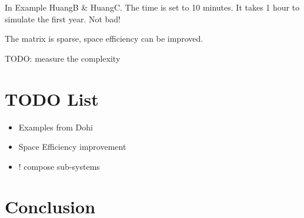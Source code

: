 \documentclass[10pt, journal, compsoc, authoryear]{article}
\numberwithin{equation}{subsection}
\theoremstyle{definition}
\begin{document}
In Example HuangB \& HuangC.  The time is set to 10 minutes.  It takes 1 hour to
simulate the first year.  Not bad!

The matrix is sparse, space efficiency can be improved.


TODO: measure the complexity 


\section{TODO List}


\begin{itemize}
  \item Examples from Dohi
  \item Space Efficiency improvement
  \item ! compose sub-systems
\end{itemize}



\section{Conclusion}









%  

\end{document}
